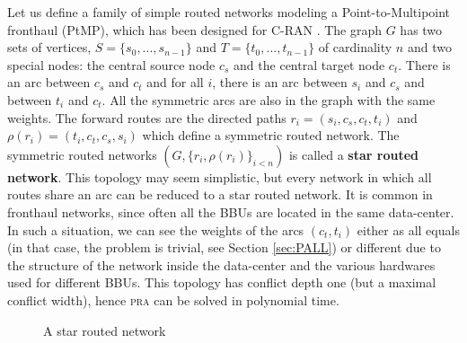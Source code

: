 \documentclass[10pt, conference, letterpaper]{IEEEtran}
\newcommand\pra{\textsc{pra}\xspace}
\begin{document}
   
    
       Let us define a family of simple routed networks modeling a Point-to-Multipoint fronthaul (PtMP), which has been designed for C-RAN \cite{tayq2017real}. 
      The graph $G$ has two sets of vertices, $S=\{s_0,...,s_{n-1}\}$ and $T=\{t_0,...,t_{n-1}\}$ of cardinality $n$ and two special nodes: the central source node {\bf $c_s$} and the central target node {\bf $c_t$}.
      There is an arc between {\bf $c_s$} and {\bf $c_t$} and for all $i$, there is an arc between $s_i$ and $c_s$ and between $t_i$ and $c_t$. All the symmetric arcs are also in the graph with the same weights.
      The forward routes are the directed paths $r_i = (s_i,c_s,c_t,t_i)$ and $\rho(r_i) = (t_i,c_t,c_s,s_i)$ which define a symmetric routed network. 
      The symmetric routed networks $(G, \{r_i,\rho(r_i)\}_{i<n})$ is called a \textbf{star routed network}. This topology may seem simplistic, but every network in which all routes share an arc can be reduced to a star routed network. It is common in fronthaul networks, since often all the BBUs are located in the same data-center. In such a situation, we can see the weights of the arcs $(c_t,t_i)$ either as all equals (in that case, the problem is trivial, see Section \ref{sec:PALL}) or different due to the structure of the network inside the data-center and the various hardwares used for different BBUs. This topology has conflict depth one (but a maximal conflict width), hence \pra can be solved in polynomial time.
      \begin{figure}
       \begin{center}

  \end{center}
  \caption{A star routed network}
  \end{figure}
	
\end{document}
